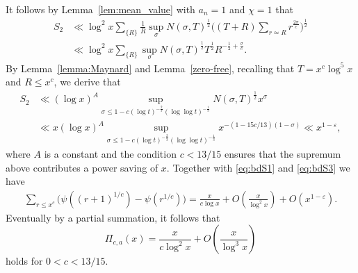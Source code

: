 \documentclass[12pt, reqno, twoside, letterpaper]{amsart}
\numberwithin{equation}{section}
\def\eps{\varepsilon}
\theoremstyle{customthm}
\theoremstyle{customrem}
\begin{document}
It follows by Lemma~\ref{lem:mean_value} with $a_n=1$ and $\chi=1$ that
\begin{align*}
S_2&\ll \log^2 x \sum_{\{R\}}\frac{1}{R} \sup_{\sigma} N(\sigma,T)^{\frac{1}{2}} \bigg( (T+R)\sum_{r\simeq R} r^{\frac{2\sigma}{c}}\bigg)^{\frac{1}{2}}\\
&\ll \log^2 x \sum_{\{R\}}  \sup_{\sigma}N(\sigma,T)^{\frac{1}{2}}T^{\frac{1}{2}}R^{-\frac{1}{2}+\frac{\sigma}{c}}.
\end{align*}
By Lemma~\ref{lemma:Maynard} and Lemma~\ref{zero-free}, recalling that $T=x^c\log ^5x$ and $R\leqslant x^c$, we derive that
\begin{align*}
S_2&\ll (\log x)^A \sup_{\sigma\leqslant 1-c(\log t)^{-\frac{2}{3}}(\log\log t)^{-\frac{1}{3}}} N(\sigma,T)^{\frac{1}{2}} x^\sigma \\
&\ll x(\log x)^A \sup_{\sigma\leqslant 1-c(\log t)^{-\frac{2}{3}}(\log\log t)^{-\frac{1}{3}}}x^{-(1-15c/13)(1-\sigma)}\ll x^{1-\eps},
\end{align*}
where $A$ is a constant and the condition $c< 13/15$ ensures that the supremum above contributes a power saving of $x$. Together with \eqref{eq:bdS1} and \eqref{eq:bdS3} we have
\begin{align*}
\sum_{r\leqslant x^c} \bigg( \psi((r+1)^{1/c})-\psi(r^{1/c}) \bigg)=\frac{x}{c\log x} + O(\frac{x}{\log ^2x}) + O(x^{1-\eps}).
\end{align*} 
Eventually by a partial summation, it follows that
$$
\Pi_{c,a}(x) = \frac{x}{c\log ^2x} + O(\frac{x}{\log ^3x})
$$
holds for $0<c< 13/15$.
\end{document}
